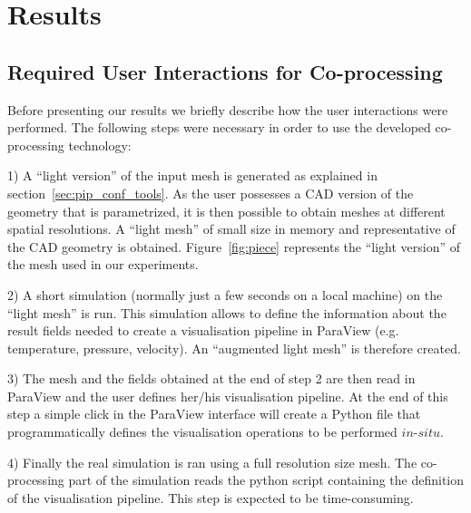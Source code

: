 \section{Results}
\label{sec:results}

\subsection{Required User Interactions for Co-processing}
   
Before presenting our results we briefly describe how the user interactions were
performed. The following steps were necessary in order to use the developed
co-processing technology:

1) A ``light version'' of the input mesh is generated as explained in section~\ref{sec:pip_conf_tools}. 
As the user possesses a CAD version of the geometry that is parametrized, it is then possible to
obtain meshes at different spatial resolutions. A ``light mesh'' of small size in
memory and representative of the CAD geometry is obtained. Figure~\ref{fig:piece} represents
the ``light version'' of the mesh used in our experiments.

2) A short simulation (normally just a few seconds on a local machine) on the ``light mesh'' is run.
This simulation allows to define the information about the result fields needed to create a
visualisation pipeline in ParaView (e.g. temperature, pressure, velocity). An ``augmented light mesh''
is therefore created.

3) The mesh and the fields obtained at the end of step 2 are then read in ParaView
and the user defines her/his visualisation pipeline. At the end of this step
a simple click in the ParaView interface will create a Python file that
programmatically defines the visualisation operations to be performed
$in$-$situ$.

4) Finally the real simulation is ran using a full resolution size mesh. The
co-processing part of the simulation reads the python script containing the
definition of the visualisation pipeline. This step is expected to be
time-consuming.

